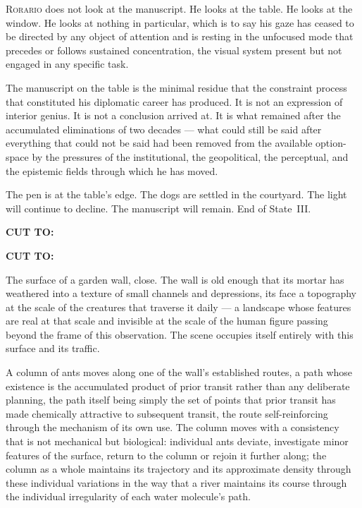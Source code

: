 \documentclass[12pt, oneside]{article}
\newcommand{\sceneheading}[1]{%
  \vspace{1.8em}%
  \noindent{\bfseries\large\MakeUppercase{#1}}%
  \vspace{0.6em}%
  \par\noindent{\color{rulecolor}\rule{\linewidth}{0.3pt}}%
  \vspace{0.5em}\par%
}
\newenvironment{action}{%
  \vspace{0.6em}%
  \noindent\ignorespaces%
}{%
  \par\vspace{0.6em}%
}
\newcommand{\scenenumber}[1]{%
  \vspace{1em}%
  \noindent{\small\bfseries\scshape Scene #1}%
  \vspace{0.3em}\par%
}
\newcommand{\transition}[1]{%
  \vspace{0.8em}%
  \begin{flushright}%
    \bfseries #1%
  \end{flushright}%
  \vspace{0.5em}%
}
\begin{document}
\begin{action}
\textsc{Rorario} does not look at the manuscript. He looks at the table. He looks at the window. He looks at nothing in particular, which is to say his gaze has ceased to be directed by any object of attention and is resting in the unfocused mode that precedes or follows sustained concentration, the visual system present but not engaged in any specific task.

The manuscript on the table is the minimal residue that the constraint process that constituted his diplomatic career has produced. It is not an expression of interior genius. It is not a conclusion arrived at. It is what remained after the accumulated eliminations of two decades --- what could still be said after everything that could not be said had been removed from the available option-space by the pressures of the institutional, the geopolitical, the perceptual, and the epistemic fields through which he has moved.

The pen is at the table's edge. The dogs are settled in the courtyard. The light will continue to decline. The manuscript will remain. End of State~III.
\end{action}

\transition{CUT TO:}

\transition{CUT TO:}

\scenenumber{16c — The Ants}

\sceneheading{EXT. Stone Wall, Garden — Day}

\begin{action}
The surface of a garden wall, close. The wall is old enough that its mortar has weathered into a texture of small channels and depressions, its face a topography at the scale of the creatures that traverse it daily --- a landscape whose features are real at that scale and invisible at the scale of the human figure passing beyond the frame of this observation. The scene occupies itself entirely with this surface and its traffic.

A column of ants moves along one of the wall's established routes, a path whose existence is the accumulated product of prior transit rather than any deliberate planning, the path itself being simply the set of points that prior transit has made chemically attractive to subsequent transit, the route self-reinforcing through the mechanism of its own use. The column moves with a consistency that is not mechanical but biological: individual ants deviate, investigate minor features of the surface, return to the column or rejoin it further along; the column as a whole maintains its trajectory and its approximate density through these individual variations in the way that a river maintains its course through the individual irregularity of each water molecule's path.
\end{action}
\end{document}
